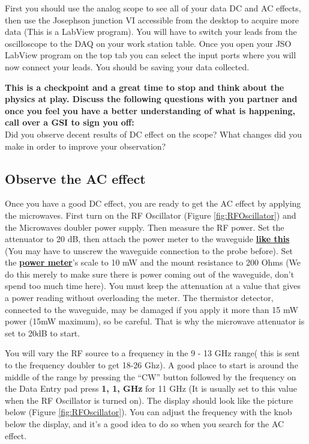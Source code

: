 \documentclass{../lab}
\begin{document}
First you should use the analog scope to see all of your data DC and AC effects, then use the Josephson junction VI accessible from the desktop to acquire more data (This is a LabView program). You will have to switch your leads from the oscilloscope to the DAQ on your work station table. Once you open your JSO LabView program  on the top tab you can select the input ports where you will now connect your leads. You should be saving your data collected.

\textbf{This is a checkpoint and a great time to stop and think about the physics at play. Discuss the following questions with you partner and once you feel you have a better understanding of what is happening, call over a GSI to sign you off:}\\
Did you observe decent results of DC effect on the scope? What changes did you make in order to improve your observation?

\subsection{Observe the AC effect}

Once you have a good DC effect, you are ready to get the AC effect by applying the microwaves. First turn on the RF Oscillator (Figure \ref{fig:RFOscillator}) and the Microwaves doubler power supply. Then measure the RF power. Set the attenuator to 20 dB, then attach the power meter to the waveguide \href{http://experimentationlab.berkeley.edu/sites/default/files/JOS/waveguide.jpeg}{\textbf{like this}} (You may have to unscrew the waveguide connection to the probe before). Set the \href{http://experimentationlab.berkeley.edu/sites/default/files/JOS/image.jpeg}{\textbf{power meter}}'s scale to 10 mW and the mount resistance to 200 Ohms (We do this merely to make sure there is power coming out of the waveguide, don't spend too much time here). You must keep the attenuation at a value that gives a power reading without overloading the meter. The thermistor detector, connected to the waveguide, may be damaged if you apply it more than 15 mW power (15mW maximum), so be careful. That is why the microwave attenuator is set to 20dB to start.

You will vary the RF source to a frequency in the 9 - 13 GHz range( this is sent to the frequency doubler to get 18-26 Ghz). A good place to start is around the middle of the range by pressing the ``CW'' button followed by the frequency on the Data Entry pad press\textbf{ 1, 1, GHz} for 11 GHz (It is usually set to this value when the RF Oscillator is turned on). The display should look like the picture below (Figure \ref{fig:RFOscillator}). You can adjust the frequency with the knob below the display, and it's a good idea to do so when you search for the AC effect.
\end{document}
